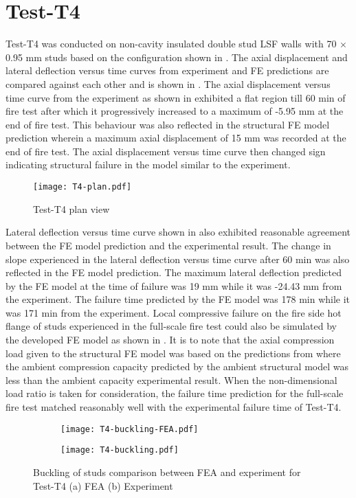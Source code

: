\section*{Test-T4}

Test-T4 was conducted on non-cavity insulated double stud LSF walls with 70 $\times$ 0.95 mm studs based on the configuration shown in . The axial displacement and lateral deflection versus time curves from experiment and FE predictions are compared against each other and is shown in . The axial displacement versus time curve from the experiment as shown in  exhibited a flat region till 60 min of fire test after which it progressively increased to a maximum of -5.95 mm at the end of fire test. This behaviour was also reflected in the structural FE model prediction wherein a maximum axial displacement of 15 mm was recorded at the end of fire test. The axial displacement versus time curve then changed sign indicating structural failure in the model similar to the experiment. 
\begin{figure}[!htbp]
	\centering
			\texttt{[image: T4-plan.pdf]}\\
		\caption{Test-T4 plan view}
		\label{fig:T4-plan-FEA}
\end{figure}Lateral deflection versus time curve shown in  also exhibited reasonable agreement between the FE model prediction and the experimental result. The change in slope experienced in the lateral deflection versus time curve after 60 min was also reflected in the FE model prediction. The maximum lateral deflection predicted by the FE model at the time of failure was 19 mm while it was -24.43 mm from the experiment. The failure time predicted by the FE model was 178 min while it was 171 min from the experiment. Local compressive failure on the fire side hot flange of studs experienced in the full-scale fire test could also be simulated by the developed FE model as shown in . It is to note that the axial compression load given to the structural FE model was based on the predictions from  where the ambient compression capacity predicted by the ambient structural model was less than the ambient capacity experimental result. When the non-dimensional load ratio is taken for consideration, the failure time prediction for the full-scale fire test matched reasonably well with the experimental failure time of Test-T4.   
\begin{figure}[!htbp]
	\centering
	\begin{subfigure}[b]{0.8\textwidth}
		\centering
		\texttt{[image: T4-buckling-FEA.pdf]}
		\caption{}
		\label{subfig:T4-buckling-FEA}
	\end{subfigure}
	\begin{subfigure}[b]{0.3\textwidth}
		\centering
		\texttt{[image: T4-buckling.pdf]}
		\caption{}
		\label{subfig:T4-buckling-FEA-Exp}
	\end{subfigure}
	   \caption{Buckling of studs comparison between FEA and experiment for Test-T4 (a) FEA (b) Experiment}
	   \label{fig:T4-buckling-FE-vs-Exp}
\end{figure} 
